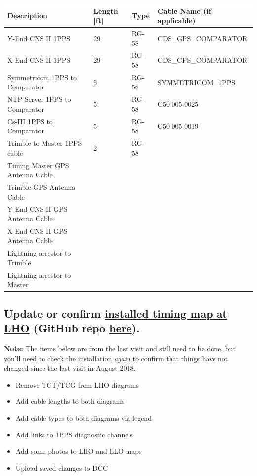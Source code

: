 \documentclass{article}
\newcommand*{\TODO}{\textcolor{todo}}
\begin{document}
\begin{center}
  \label{table:lho-cables}
  \begin{tabular}{ | l | l | l | l | }
    \hline
    \textbf{Description}  			& \textbf{Length [ft]} 	& \textbf{Type} 		& \textbf{Cable Name (if applicable)} \\ \hline
    Y-End CNS II 1PPS  				& 29 					& RG-58 				& CDS\_GPS\_COMPARATOR \\ \hline
    X-End CNS II 1PPS				& 29					& RG-58					& CDS\_GPS\_COMPARATOR \\ \hline
    Symmetricom 1PPS to Comparator	& 5 					& RG-58					& SYMMETRICOM\_1PPS \\ \hline
    NTP Server 1PPS to Comparator	& 5 					& RG-58					& C50-005-0025 \\ \hline
    Cs-III 1PPS to Comparator		& 5 					& RG-58					& C50-005-0019 \\ \hline
    Trimble to Master 1PPS cable	& 2 					& RG-58					& \\ \hline
    Timing Master GPS Antenna Cable	&  						& 						& \\ \hline
    Trimble GPS Antenna Cable		&  						& 						& \\ \hline
    Y-End CNS II GPS Antenna Cable	&  						& 						& \\ \hline
    X-End CNS II GPS Antenna Cable	&  						& 						& \\ \hline
    Lightning arrestor to Trimble	&  						& 						& \\ \hline
    Lightning arrestor to Master	&  						& 						& \\
    \hline
  \end{tabular}
\end{center}

\TODO{
\subsection{
    Update or confirm
    \href{https://dcc.ligo.org/LIGO-D1500201}{installed timing map at LHO} (GitHub repo
    \href{https://github.com/stefco/geco_channels}{here}).
}
}
\textbf{Note:} The items below are from the last visit and still need to be done, but you'll need to check the installation \textit{again} to confirm that things have not changed since the last visit in August 2018. 
\begin{itemize}
  \item{\TODO{Remove TCT/TCG from LHO diagrams}}
  \item{\TODO{Add cable lengths to both diagrams}}
  \item{\TODO{Add cable types to both diagrams via legend}}
  \item{\TODO{Add links to 1PPS diagnostic channels}}
  \item{\TODO{Add some photos to LHO and LLO maps}}
  \item{\TODO{Upload saved changes to DCC}}
\end{itemize}
\end{document}
